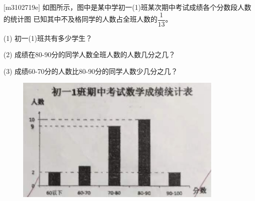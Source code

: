 \begin{minipage}[c]{0.5\textwidth}
    [m3102719e]\quad
    如图所示，图中是某中学初一(1)班某次期中考试成绩各个分数段人数的统计图
    已知其中不及格同学的人数占全班人数的$\dfrac{1}{13}$。 \par
    (1) 初一(1)班共有多少学生？ \par
    (2) 成绩在80-90分的同学人数全班人数的人数几分之几？ \par
    (3) 成绩60-70分的人数比80-90分的同学人数少几分之几？
\end{minipage}
\begin{minipage}[c]{0.5\textwidth}
    \begin{figure}[H]
        \centering
        \includegraphics[width=0.9\textwidth,keepaspectratio]{m3102719eb}
    \end{figure}
\end{minipage}   
